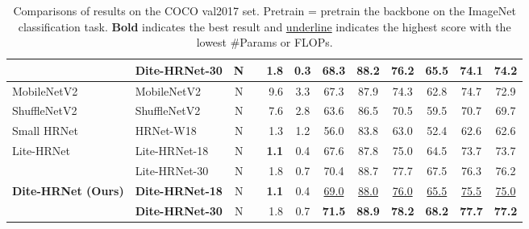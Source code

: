 \documentclass{article}
\begin{document}
\begin{table*}[t]
{\begin{tabular}{llclrccccccc}
& \textbf{Dite-HRNet-30} & N &  & 1.8 & 0.3 & 68.3 & 88.2 & 76.2 & 65.5 & 74.1 & 74.2\\
\midrule
MobileNetV2  \cite{sandler:mobile2} & MobileNetV2 & N &  & 9.6 & 3.3 & 67.3 & 87.9 & 74.3 & 62.8 & 74.7 & 72.9\\

ShuffleNetV2  \cite{ma:shuffle2} & ShuffleNetV2 & N &  & 7.6 & 2.8 & 63.6 & 86.5 & 70.5 & 59.5 & 70.7 & 69.7\\

Small HRNet \cite{wang:smallhrnet} & HRNet-W18 & N &  & 1.3 & 1.2 & 56.0 & 83.8 & 63.0 & 52.4 & 62.6 & 62.6\\

Lite-HRNet \cite{yu:litehrnet} & Lite-HRNet-18 & N &  & \textbf{1.1} & 0.4 & 67.6 & 87.8 & 75.0 & 64.5 & 73.7 & 73.7\\

& Lite-HRNet-30 & N &  & 1.8 & 0.7 & 70.4 & 88.7 & 77.7 & 67.5 & 76.3 & 76.2\\

\textbf{Dite-HRNet (Ours)} & \textbf{Dite-HRNet-18} & N &  & \textbf{1.1} & 0.4 & \underline{69.0} & \underline{88.0} & \underline{76.0} & \underline{65.5} & \underline{75.5} & \underline{75.0}\\

& \textbf{Dite-HRNet-30} & N &  & 1.8 & 0.7 & \textbf{71.5} & \textbf{88.9} & \textbf{78.2} & \textbf{68.2} & \textbf{77.7} & \textbf{77.2}\\
\bottomrule
\end{tabular}}
\caption{Comparisons of results on the COCO val2017 set. Pretrain = pretrain the backbone on the ImageNet classification task. \textbf{Bold} indicates the best result and \underline{underline} indicates the highest score with the lowest \#Params or FLOPs.}
\label{tab2}
\end{table*}
\end{document}
